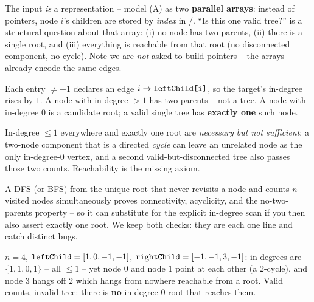 The input \emph{is} a representation -- model (A) as two \textbf{parallel arrays}: instead
of pointers, node $i$'s children are stored by \emph{index} in
/. ``Is this one valid tree?'' is a structural
question about that array: (i) no node has two parents, (ii) there is a single root, and
(iii) everything is reachable from that root (no disconnected component, no cycle). Note
we are \emph{not} asked to build pointers -- the arrays already encode the same edges.

\begin{observation}
Each entry  $\neq -1$ declares an edge $i \to \texttt{leftChild[i]}$, so
the target's in-degree rises by $1$. A node with in-degree $>1$ has two parents -- not a
tree. A node with in-degree $0$ is a candidate root; a valid single tree has \textbf{exactly
one} such node.
\end{observation}
\begin{observation}
In-degree $\le 1$ everywhere and exactly one root are \emph{necessary but not sufficient}:
a two-node component that is a directed \emph{cycle} can leave an unrelated node as the
only in-degree-$0$ vertex, and a second valid-but-disconnected tree also passes those
two counts. Reachability is the missing axiom.
\end{observation}
\begin{observation}
A DFS (or BFS) from the unique root that never revisits a node and counts $n$ visited
nodes simultaneously proves connectivity, acyclicity, and the no-two-parents property --
so it can substitute for the explicit in-degree scan if you then also assert exactly one
root. We keep both checks: they are each one line and catch distinct bugs.
\end{observation}

\begin{thinkbox}
{$n=4$, $\texttt{leftChild}=[1,0,-1,-1]$, $\texttt{rightChild}=[-1,-1,3,-1]$: in-degrees are
$\{1,1,0,1\}$ -- all $\le 1$ -- yet node $0$ and node $1$ point at each other (a $2$-cycle),
and node $3$ hangs off $2$ which hangs from nowhere reachable from a root. Valid counts,
invalid tree: there is \textbf{no} in-degree-$0$ root that reaches them.}
\end{thinkbox}

